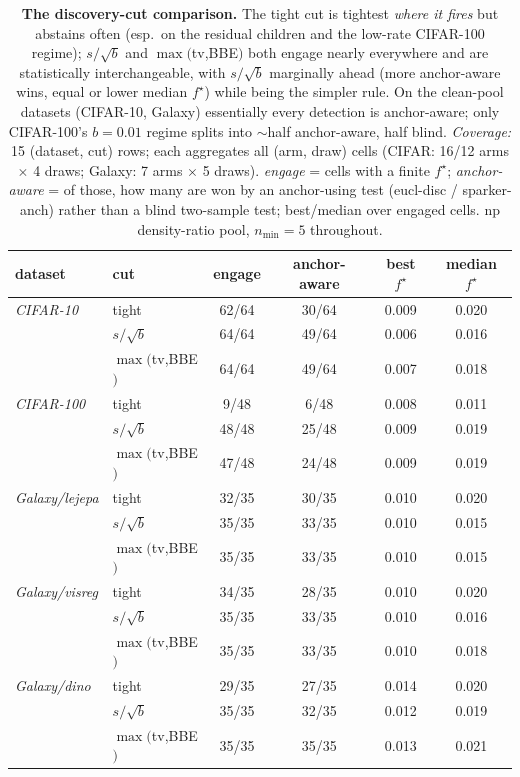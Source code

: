\begin{table}[t]
\centering
\small
\begin{tabular}{llcccc}
\toprule
dataset & cut & engage & anchor-aware & best $f^\star$ & median $f^\star$ \\
\midrule
\emph{CIFAR-10} & tight & 62/64 & 30/64 & 0.009 & 0.020 \\
 & $s/\sqrt{b}$ & 64/64 & 49/64 & 0.006 & 0.016 \\
 & $\max($tv,BBE$)$ & 64/64 & 49/64 & 0.007 & 0.018 \\
\addlinespace
\emph{CIFAR-100} & tight & 9/48 & 6/48 & 0.008 & 0.011 \\
 & $s/\sqrt{b}$ & 48/48 & 25/48 & 0.009 & 0.019 \\
 & $\max($tv,BBE$)$ & 47/48 & 24/48 & 0.009 & 0.019 \\
\addlinespace
\emph{Galaxy/lejepa} & tight & 32/35 & 30/35 & 0.010 & 0.020 \\
 & $s/\sqrt{b}$ & 35/35 & 33/35 & 0.010 & 0.015 \\
 & $\max($tv,BBE$)$ & 35/35 & 33/35 & 0.010 & 0.015 \\
\addlinespace
\emph{Galaxy/visreg} & tight & 34/35 & 28/35 & 0.010 & 0.020 \\
 & $s/\sqrt{b}$ & 35/35 & 33/35 & 0.010 & 0.016 \\
 & $\max($tv,BBE$)$ & 35/35 & 33/35 & 0.010 & 0.018 \\
\addlinespace
\emph{Galaxy/dino} & tight & 29/35 & 27/35 & 0.014 & 0.020 \\
 & $s/\sqrt{b}$ & 35/35 & 32/35 & 0.012 & 0.019 \\
 & $\max($tv,BBE$)$ & 35/35 & 35/35 & 0.013 & 0.021 \\
\bottomrule
\end{tabular}
\caption{\textbf{The discovery-cut comparison.}  The tight cut is tightest \emph{where it fires} but abstains often (esp.\ on the residual children and the low-rate CIFAR-100 regime); $s/\sqrt{b}$ and $\max($tv,BBE$)$ both engage nearly everywhere and are statistically interchangeable, with $s/\sqrt{b}$ marginally ahead (more anchor-aware wins, equal or lower median $f^\star$) while being the simpler rule.  On the clean-pool datasets (CIFAR-10, Galaxy) essentially every detection is anchor-aware; only CIFAR-100's $b{=}0.01$ regime splits into $\sim$half anchor-aware, half blind. \emph{Coverage:} 15 (dataset, cut) rows; each aggregates all (arm, draw) cells (CIFAR: 16/12 arms $\times$ 4 draws; Galaxy: 7 arms $\times$ 5 draws).  \emph{engage} = cells with a finite $f^\star$; \emph{anchor-aware} = of those, how many are won by an anchor-using test (eucl-disc / sparker-anch) rather than a blind two-sample test; best/median over engaged cells.  np density-ratio pool, $n_{\min}{=}5$ throughout.}
\label{tab:cut_summary}
\end{table}
